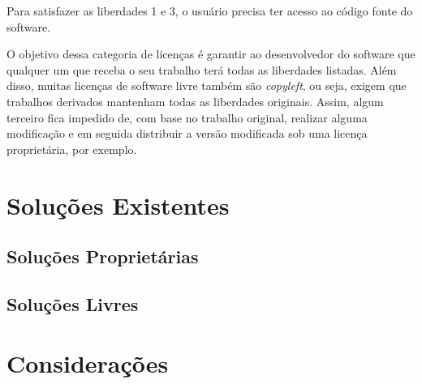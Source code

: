Para satisfazer as liberdades 1 e 3, o usuário precisa ter acesso ao código fonte do software.

O objetivo dessa categoria de licenças é garantir ao desenvolvedor do software que qualquer um que receba o seu trabalho terá todas as liberdades listadas. Além disso, muitas licenças de software livre também são \emph{copyleft}, ou seja, exigem que trabalhos derivados mantenham todas as liberdades originais. Assim, algum terceiro fica impedido de, com base no trabalho original, realizar alguma modificação e em seguida distribuir a versão modificada sob uma licença proprietária, por exemplo.


\section{Soluções Existentes}

\subsection{Soluções Proprietárias}

\subsection{Soluções Livres}

\section{Considerações}


